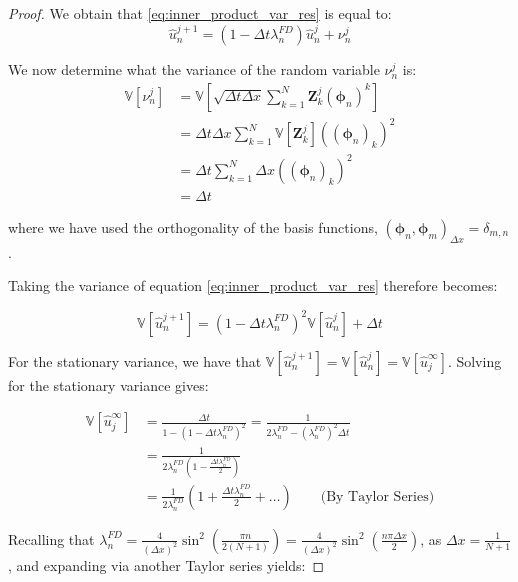 \begin{proof}
We obtain that \eqref{eq:inner_product_var_res} is equal to:
\begin{equation}
    \hat{u}_n^{j+1} = (1 - \Delta t \lambda_n^{FD}) \hat{u}_n^j + 
    \nu_n^j
\end{equation}

We now determine what the variance of the random variable 
$\nu_n^j$ is:
\begin{align*}
    \mathbb{V}[\nu_n^j] &= \mathbb{V}\left[\sqrt{\Delta t \Delta x}
    \sum_{k=1}^N\mathbf{Z}_k^j(\boldsymbol{\phi}_n)^k\right] \\
    &=\Delta t \Delta x \sum_{k=1}^N \mathbb{V}[\mathbf{Z}_k^j]
    ((\boldsymbol{\phi}_n)_k)^2 \\
    &= \Delta t \sum_{k=1}^N \Delta x  ((\boldsymbol{\phi}_n)_k)^2\\
    &= \Delta t
\end{align*}

where we have used the orthogonality of the basis functions, 
$(\boldsymbol{\phi}_n, \boldsymbol{\phi}_m)_{\Delta x} = 
\delta_{m,n}$.

Taking the variance of equation 
\eqref{eq:inner_product_var_res} therefore becomes:

\begin{equation}\label{eq:var_of_relation}
    \mathbb{V}[\hat{u}_n^{j+1}] = (1-\Delta t \lambda_n^{FD})^2
    \mathbb{V}[\hat{u}_n^j] + \Delta t
\end{equation}

For the stationary variance, we have that 
$\mathbb{V}[\hat{u}_n^{j+1}] = 
\mathbb{V}[\hat{u}_n^{j}] = 
\mathbb{V}[\hat{u}_j^\infty]$. Solving for the stationary 
variance gives:

\begin{align}
\mathbb{V}[\hat{u}_j^\infty] 
&= \frac{\Delta t}{1 - 
(1-\Delta t \lambda_n^{FD})^2} = 
\frac{1}{2\lambda_n^{FD} - 
(\lambda_n^{FD})^2 \Delta t}
\label{eq:fourier_variance_stationary}
\\
&= \frac{1}{2\lambda_n^{FD}(1 - \frac{\Delta t \lambda_n^{FD}}{2})}\\
&= \frac{1}{2\lambda_n^{FD}}(1 + \frac{\Delta t \lambda_n^{FD}}{2}
+ \dots)\label{eq:using_taylor_series} \qquad 
\text{(By Taylor Series)}
\end{align}

Recalling that $\lambda_n^{FD} = \frac{4}{(\Delta x)^2}
\sin^2\left(\frac{\pi n}{2(N+1)}\right) = \frac{4}{(\Delta x)^2}
\sin^2\left(\frac{n \pi \Delta x}{2}\right)$, as $\Delta x = \frac{1}
{N+1}$, and expanding via another Taylor series yields:


\end{proof}
